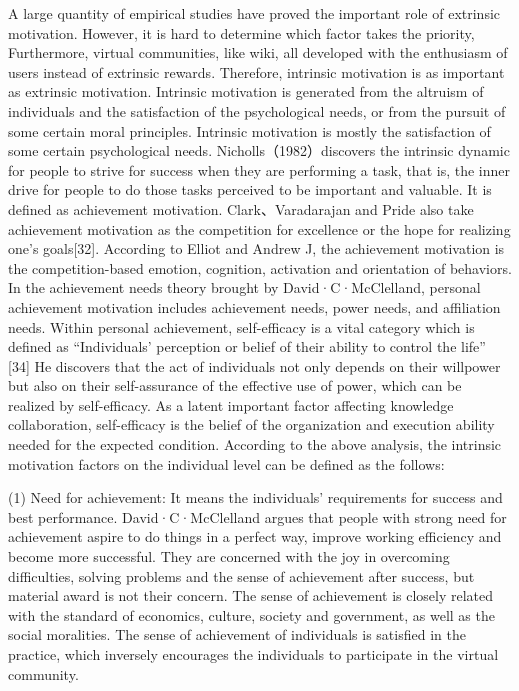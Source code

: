 \documentclass{elsarticle}
\begin{document}
A large quantity of empirical studies have proved the important role
of extrinsic motivation. However, it is hard to determine which factor
takes the priority, Furthermore, virtual communities, like wiki, all
developed with the enthusiasm of users instead of extrinsic
rewards. Therefore, intrinsic motivation is as important as extrinsic
motivation. Intrinsic motivation is generated from the altruism of
individuals and the satisfaction of the psychological needs, or from
the pursuit of some certain moral principles. Intrinsic motivation is
mostly the satisfaction of some certain psychological
needs. Nicholls（1982）discovers the intrinsic dynamic for people to
strive for success when they are performing a task, that is, the inner
drive for people to do those tasks perceived to be important and
valuable. It is defined as achievement motivation. Clark、Varadarajan
and Pride also take achievement motivation as the competition for
excellence or the hope for realizing one’s goals[32]. According to
Elliot and Andrew J, the achievement motivation is the
competition-based emotion, cognition, activation and orientation of
behaviors. In the achievement needs theory brought by
David·C·McClelland, personal achievement motivation includes
achievement needs, power needs, and affiliation needs. Within personal
achievement, self-efficacy is a vital category which is defined as
“Individuals’ perception or belief of their ability to control the
life” [34] He discovers that the act of individuals not only depends
on their willpower but also on their self-assurance of the effective
use of power, which can be realized by self-efficacy. As a latent
important factor affecting knowledge collaboration, self-efficacy is
the belief of the organization and execution ability needed for the
expected condition. According to the above analysis, the intrinsic
motivation factors on the individual level can be defined as the
follows: 

(1) Need for achievement: It means the individuals’ requirements for
success and best performance. David·C·McClelland argues that people
with strong need for achievement aspire to do things in a perfect way,
improve working efficiency and become more successful. They are
concerned with the joy in overcoming difficulties, solving problems
and the sense of achievement after success, but material award is not
their concern. The sense of achievement is closely related with the
standard of economics, culture, society and government, as well as the
social moralities. The sense of achievement of individuals is
satisfied in the practice, which inversely encourages the individuals
to participate in the virtual community. 
\end{document}
